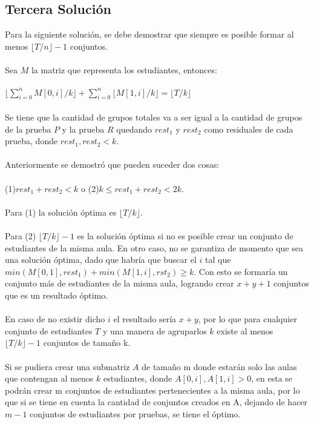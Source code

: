 \documentclass{article}
\begin{document}
\subsection{Tercera Solución}
Para la siguiente solución, se debe demostrar que siempre es posible formar al menos $\lfloor T/n \rfloor - 1$ conjuntos.
\\
\\
Sea $M$ la matriz que representa los estudiantes, entonces:
\\
\\
$\lfloor \sum_{i=0}^{n} M[0,i]/k \rfloor+\sum_{i=0}^{n} \lfloor M[1,i]/k \rfloor = \lfloor T/k \rfloor $ 
\\
\\
Se tiene que la cantidad de grupos totales va a ser igual a la cantidad de grupos de la prueba $P$ y la prueba $R$ quedando $rest_1$ y $rest_2$ como residuales de cada prueba, donde $rest_1, rest_2 < k$.
\\
\\
Anteriormente se demostró que pueden suceder dos cosas:
\\
\\
(1)$rest_1 + rest_2 < k$ o (2)$k \leq rest_1 + rest_2 < 2k$.
\\
\\
Para (1) la solución óptima es $\lfloor T/k \rfloor$. 
\\
\\
Para (2) $ \lfloor T/k \rfloor - 1$ es la solución óptima si no es posible crear un conjunto de estudiantes de la misma aula. En otro caso, no se garantiza de momento que sea una solución óptima, dado que habría que buscar el $i$ tal que $min(M[0,1], rest_1) + min(M[1,i], rst_2) \geq k$. Con esto se formaría un conjunto más de estudiantes de la misma aula, logrando crear $ x + y + 1$ conjuntos que es un resultado óptimo.
\\
\\
En caso de no existir dicho $i$ el resultado sería $ x + y$, por lo que para cualquier conjunto de estudiantes $T$ y una manera de agruparlos $k$ existe al menos $\lfloor T/k \rfloor - 1$ conjuntos de tamaño k.
\\
\\
Si se pudiera crear una submatriz $A$ de tamaño m donde estarán solo las aulas que contengan al menos $k$ estudiantes, donde $A[0,i], A[1,i] > 0$, en esta se podrán crear m conjuntos de estudiantes pertenecientes a la misma aula, por lo que si se tiene en cuenta la cantidad de conjuntos creados en A, dejando de hacer $m - 1$ conjuntos de estudiantes por pruebas, se tiene el óptimo.
\end{document}
